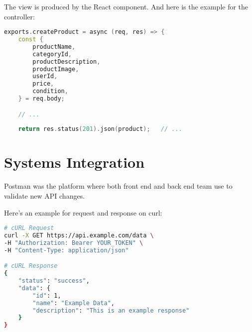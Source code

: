 The view is produced by the React component. And here is the example for the controller:

\begin{lstlisting}[language=C++, caption={Controller for MVC architecture}]
exports.createProduct = async (req, res) => {
	const {
		productName,
		categoryId,
		productDescription,
		productImage,
		userId,
		price,
		condition,
	} = req.body;

	// ...
	
	return res.status(201).json(product); 	// ...
\end{lstlisting}

\section{Systems Integration}

Postman was the platform where both front end and back end team use to validate new API changes.

Here's an example for request and response on curl:


\begin{lstlisting}[language=bash, caption={Example for API integration}]
# cURL Request
curl -X GET https://api.example.com/data \
-H "Authorization: Bearer YOUR_TOKEN" \
-H "Content-Type: application/json"

# cURL Response
{
	"status": "success",
	"data": {
		"id": 1,
		"name": "Example Data",
		"description": "This is an example response"
	}
}
\end{lstlisting}

\clearpage